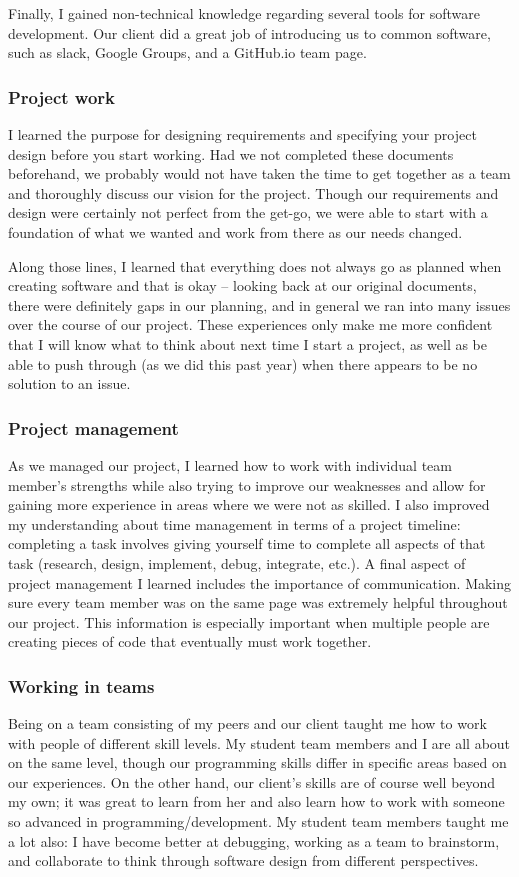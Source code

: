 \documentclass[onecolumn, draftclsnofoot,10pt, compsoc]{IEEEtran}
\begin{document}
\begin{flushleft}
Finally, I gained non-technical knowledge regarding several tools for software development. Our client did a great job of introducing us to common software, such as slack, Google Groups, and a GitHub.io team page.
 
\subsubsection{Project work}
I learned the purpose for designing requirements and specifying your project design before you start working. Had we not completed these documents beforehand, we probably would not have taken the time to get together as a team and thoroughly discuss our vision for the project. Though our requirements and design were certainly not perfect from the get-go, we were able to start with a foundation of what we wanted and work from there as our needs changed.
 
Along those lines, I learned that everything does not always go as planned when creating software and that is okay – looking back at our original documents, there were definitely gaps in our planning, and in general we ran into many issues over the course of our project. These experiences only make me more confident that I will know what to think about next time I start a project, as well as be able to push through (as we did this past year) when there appears to be no solution to an issue.
 
\subsubsection{Project management}
As we managed our project, I learned how to work with individual team member's strengths while also trying to improve our weaknesses and allow for gaining more experience in areas where we were not as skilled. I also improved my understanding about time management in terms of a project timeline: completing a task involves giving yourself time to complete all aspects of that task (research, design, implement, debug, integrate, etc.). A final aspect of project management I learned includes the importance of communication. Making sure every team member was on the same page was extremely helpful throughout our project. This information is especially important when multiple people are creating pieces of code that eventually must work together.
 
\subsubsection{Working in teams}
Being on a team consisting of my peers and our client taught me how to work with people of different skill levels. My student team members and I are all about on the same level, though our programming skills differ in specific areas based on our experiences. On the other hand, our client's skills are of course well beyond my own; it was great to learn from her and also learn how to work with someone so advanced in programming/development. My student team members taught me a lot also: I have become better at debugging, working as a team to brainstorm, and collaborate to think through software design from different perspectives.
 

\end{flushleft}
\end{document}
